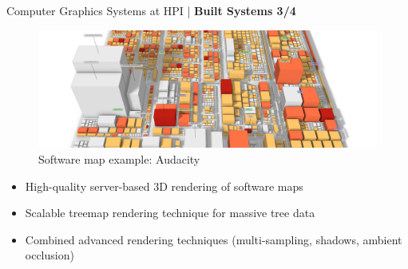 \begin{frame}{Computer Graphics Systems at HPI | \textbf{Built Systems 3/4}}

    \begin{figure}
 	   \includegraphics[height=0.278\textwidth]{images/audacity}
 	   \caption{Software map example: Audacity}
	\end{figure}
    
    
    \begin{itemize}
    	\item High-quality server-based 3D rendering of software maps
    	\item Scalable treemap rendering technique for massive tree data
    	\item Combined advanced rendering techniques (multi-sampling, shadows, ambient occlusion)
    \end{itemize}
    
\end{frame}


